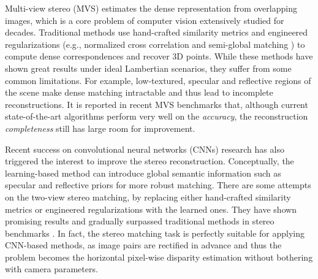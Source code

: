 \documentclass[runningheads]{llncs}
\begin{document}
Multi-view stereo (MVS) estimates the dense representation from overlapping images, which is a core problem of computer vision extensively studied for decades. Traditional methods use hand-crafted similarity metrics and engineered regularizations (e.g., normalized cross correlation and semi-global matching \cite{hirschmuller2008stereo}) to compute dense correspondences and recover 3D points. While these methods have shown great results under ideal Lambertian scenarios, they suffer from some common limitations. For example, low-textured, specular and reflective regions of the scene make dense matching intractable and thus lead to incomplete reconstructions. It is reported in recent MVS benchmarks \cite{aanaes2016large,knapitsch2017tanks} that, although current state-of-the-art algorithms \cite{furukawa2010accurate,vu2012high,galliani2015massively,schonberger2016pixelwise} perform very well on the \emph{accuracy}, the reconstruction \emph{completeness} still has large room for improvement. 

Recent success on convolutional neural networks (CNNs) research has also triggered the interest to improve the stereo reconstruction. Conceptually, the learning-based method can introduce global semantic information such as specular and reflective priors for more robust matching. There are some attempts on the two-view stereo matching, by replacing either hand-crafted similarity metrics \cite{zbontar2016stereo,han2015matchnet,luo2016efficient,hartmann2017learned} or engineered regularizations \cite{seki2017sgm,knobelreiter2017end,kendall2017end} with the learned ones. They have shown promising results and gradually surpassed traditional methods in stereo benchmarks \cite{geiger2012we,menze2015object}. In fact, the stereo matching task is perfectly suitable for applying CNN-based methods, as image pairs are rectified in advance and thus the problem becomes the horizontal pixel-wise disparity estimation without bothering with camera parameters.
\end{document}
